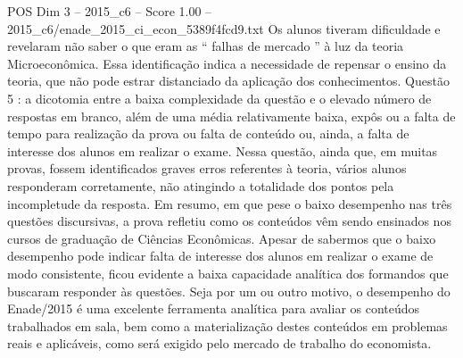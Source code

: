 \begin{textsample}{POS Dim 3 – 2015\_c6 – Score 1.00 – 2015\_c6/enade\_2015\_ci\_econ\_5389f4fcd9.txt}
Os alunos tiveram dificuldade e revelaram não saber o que eram as “ falhas de mercado ” à luz da teoria Microeconômica.
Essa identificação indica a necessidade de repensar o ensino da teoria, que não pode estrar distanciado da aplicação dos conhecimentos.
Questão 5 : a dicotomia entre a baixa complexidade da questão e o elevado número de respostas em branco, além de uma média relativamente baixa, expôs ou a falta de tempo para realização da prova ou falta de conteúdo ou, ainda, a falta de interesse dos alunos em realizar o exame.
Nessa questão, ainda que, em muitas provas, fossem identificados graves erros referentes à teoria, vários alunos responderam corretamente, não atingindo a totalidade dos pontos pela incompletude da resposta.
Em resumo, em que pese o baixo desempenho nas três questões discursivas, a prova refletiu como os conteúdos vêm sendo ensinados nos cursos de graduação de Ciências Econômicas.
Apesar de sabermos que o baixo desempenho pode indicar falta de interesse dos alunos em realizar o exame de modo consistente, ficou evidente a baixa capacidade analítica dos formandos que buscaram responder às questões.
Seja por um ou outro motivo, o desempenho do Enade/2015 é uma excelente ferramenta analítica para avaliar os conteúdos trabalhados em sala, bem como a materialização destes conteúdos em problemas reais e aplicáveis, como será exigido pelo mercado de trabalho do economista.

\end{textsample}
